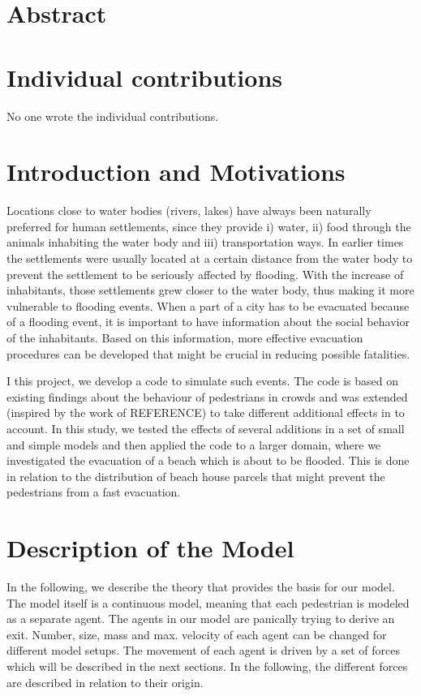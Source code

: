 \documentclass[11pt]{article}
\begin{document}
\tableofcontents

\newpage




\section{Abstract}



\section{Individual contributions}
No one wrote the individual contributions.

\section{Introduction and Motivations}
Locations close to water bodies (rivers, lakes) have always been naturally preferred for human settlements, since they provide i) water, ii) food through the animals inhabiting the water body and iii) transportation ways. In earlier times the settlements were usually located at a certain distance from the water body to prevent the settlement to be seriously affected by flooding. With the increase of inhabitants, those settlements grew closer to the water body, thus making it more vulnerable to flooding events.
When a part of a city has to be evacuated because of a flooding event, it is important to have information about the social behavior of the inhabitants. Based on this information, more effective evacuation procedures can be developed that might be crucial in reducing possible fatalities.

I this project, we develop a code to simulate such events. The code is based on existing findings about the behaviour of pedestrians in crowds and was extended (inspired by the work of REFERENCE) to take different additional effects in to account. In this study, we tested the effects of several additions in a set of small and simple models and then applied the code to a larger domain, where we investigated the evacuation of a beach which is about to be flooded. This is done in relation to the distribution of beach house parcels that might prevent the pedestrians from a fast evacuation.

\section{Description of the Model}
In the following, we describe the theory that provides the basis for our model. The model itself is a continuous model, meaning that each pedestrian is modeled as a separate agent. The agents in our model are panically trying to derive an exit. Number, size, mass and max. velocity of each agent can be changed for different model setups. The movement of each agent is driven by a set of forces which will be described in the next sections. In the following, the different forces are described in relation to their origin. 
\end{document}

